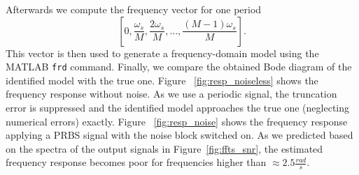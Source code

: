 \documentclass{scrartcl}
\begin{document}
Afterwards we compute the frequency vector for one period
\begin{equation}\label{eq:f_vector}
	\left[ 0, \frac{\omega_s}{M},\frac{2\omega_s}{M}, \ldots, \frac{(M-1)\omega_s}{M} \right] .
\end{equation}
This vector is then used to generate a frequency-domain model using the MATLAB \texttt{frd} command. 
Finally, we compare the obtained Bode diagram of the identified model with the true one. Figure ~\ref{fig:resp_noiseless} shows the frequency response without noise. 
As we use a periodic signal, the truncation error is suppressed and the identified model approaches the true one (neglecting numerical errors) exactly. 
Figure ~\ref{fig:resp_noise} shows the frequency response applying a PRBS signal with the noise block switched on.
As we predicted based on the spectra of the output signals in Figure~\ref{fig:ffts_snr}, the estimated frequency response becomes poor for frequencies higher than $\approx 2.5 \frac{rad}{s}$.
\end{document}
